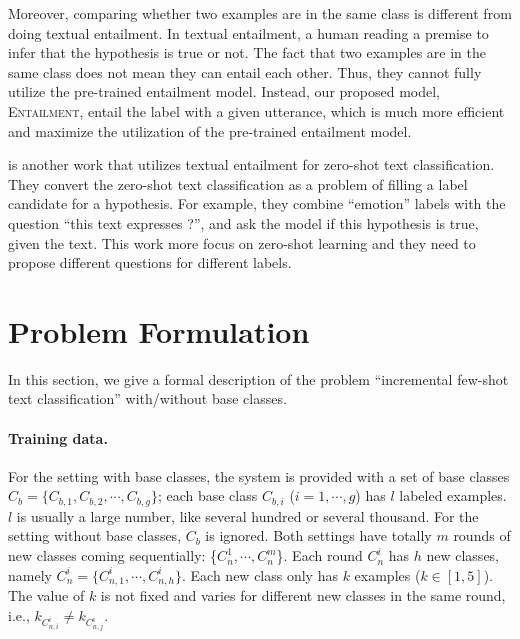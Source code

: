 \documentclass[11pt]{article}
\newcommand{\modelname}{\textsc{Entailment}}
\newcommand{\intentdata}{\textsc{IFS-Intent}}
\newcommand{\relationdata}{\textsc{IFS-Relation}}
\begin{document}
Moreover, comparing whether two examples are in the same class is different from doing textual entailment. In textual entailment, a human reading a premise to infer that the hypothesis is true or not. The fact that two examples are in the same class does not mean they can entail each other.
Thus, they cannot fully utilize the pre-trained entailment model.
Instead, our proposed model, \modelname, entail the label with a given utterance, which is much more efficient and maximize the utilization of the pre-trained entailment model. 

\citet{DBLPYinHR19} is another work that utilizes textual entailment for zero-shot text classification. They convert the zero-shot text classification as a problem of filling a label candidate for a hypothesis. For example, they combine ``emotion'' labels with the question “this text expresses ?”, and ask the model if this hypothesis is true, given the text. This work more focus on zero-shot learning and they need to propose different questions for different labels.

\section{Problem Formulation}\label{sec:probdefinitino}
In this section, we give a formal description of the problem ``incremental few-shot text classification'' with/without base classes.

\paragraph{Training data.} For the setting with base classes, the system is provided with a set of base classes $C_b=\{C_{b,1}, C_{b,2},\cdots, C_{b,g}\}$; each base class $C_{b,i}$ ($i=1,\cdots,g$) has $l$ labeled examples. $l$ is usually a large number, like several hundred or several thousand. For the setting without base classes, $C_b$ is ignored.
Both settings have totally $m$ rounds of new classes coming sequentially: \{$C_n^1, \cdots, C_n^m$\}. Each round $C_n^i$ has $h$ new classes, namely $C_n^i=\{C^i_{n,1}, \cdots, C^i_{n,h}\}$. Each new class only has $k$ examples ($k\in [1,5]$). 
The value of $k$ is not fixed and varies for different new classes in the same round, i.e., $k_{C^i_{n,i}}\neq k_{C^i_{n,j}}$.
\end{document}
